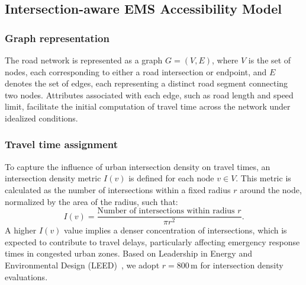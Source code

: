 \subsection{Intersection-aware EMS Accessibility Model}\label{subsec:ems_model}
\subsubsection{Graph representation}\label{subsubsec:graph}
The road network is represented as a graph \( G = (V, E) \), where \( V \) is the set of nodes, each corresponding to either a road intersection or endpoint, and \( E \) denotes the set of edges, each representing a distinct road segment connecting two nodes. Attributes associated with each edge, such as road length and speed limit, facilitate the initial computation of travel time across the network under idealized conditions.
\subsubsection{Travel time assignment}
To capture the influence of urban intersection density on travel times, an intersection density metric \( I(v) \) is defined for each node \( v \in V \). This metric is calculated as the number of intersections within a fixed radius \( r \) around the node, normalized by the area of the radius, such that:
\begin{equation}
    I(v) = \frac{\text{Number of intersections within radius } r}{\pi r^2}.
\end{equation}
A higher \( I(v) \) value implies a denser concentration of intersections, which is expected to contribute to travel delays, particularly affecting emergency response times in congested urban zones. Based on Leadership in Energy and Environmental Design (LEED)~\cite{LEED_IntersectionDensity}, we adopt \( r = 800 \, \mathrm{m} \) for intersection density evaluations.

